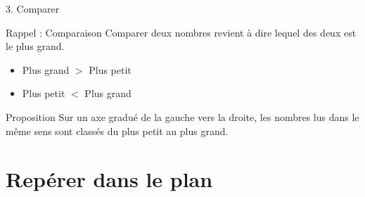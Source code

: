 \documentclass{beamer}
\begin{document}
\begin{frame}
  3. Comparer
      {
        \begin{block}{Rappel : Comparaison}	
          Comparer deux nombres revient à dire lequel des deux est le plus grand.\\
          \begin{itemize}
          \item Plus grand $>$ Plus petit
          \item Plus petit $<$ Plus grand
          \end{itemize}
        \end{block}
      }
      \begin{alertblock}{Proposition}	
        Sur un axe gradué de la gauche vers la droite, les nombres lus dans le même sens sont classés du plus petit au plus grand.
      \end{alertblock}
\end{frame}


\section{Repérer dans le plan}
\frame{\tableofcontents[sectionstyle=show/shaded, subsectionstyle=show/shaded]}
\end{document}
